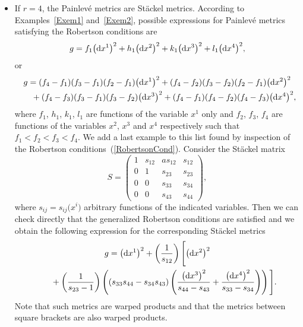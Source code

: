 \documentclass[pdftex]{sigma}
\numberwithin{equation}{section}
\begin{document}
\begin{itemize}
\item If $r=4$, the Painlev\'e metrics are St\"ackel metrics. According to Examples~\ref{Exem1} and~\ref{Exem2}, possible expressions for Painlev\'e metrics satisfying the Robertson conditions are
\begin{gather*} %
 g = f_1 \big({\rm d}x^1\big)^2 + h_1 \big({\rm d}x^2\big)^2 + k_1 \big({\rm d}x^3\big)^2 + l_1 \big({\rm d}x^4\big)^2,
\end{gather*}
or
\begin{gather*}
 g = (f_4 - f_1)(f_3-f_1)(f_2-f_1) \big({\rm d}x^1\big)^2 + (f_4-f_2)(f_3-f_2)(f_2-f_1) \big({\rm d}x^2\big)^2\nonumber \\
 \hphantom{g =}{} + (f_4-f_3)(f_3-f_1)(f_3-f_2) \big({\rm d}x^3\big)^2 + (f_4-f_1)(f_4-f_2)(f_4-f_3) \big({\rm d}x^4\big)^2, %
\end{gather*}
where $f_1$, $h_1$, $k_1$, $l_1$ are functions of the variable $x^1$ only and $f_2$, $f_3$, $f_4$ are functions of the variables $x^2$, $x^3$ and $x^4$ respectively such that $f_1 < f_2 < f_3 < f_4$. We add a last example to this list found by inspection of the Robertson conditions~(\ref{RobertsonCond}). Consider the St\"ackel matrix
\[
S=\left( \begin{matrix}
1&s_{12}&a s_{12}&s_{12}\\
0&1&s_{23}&s_{23} \\
0&0&s_{33}&s_{34} \\
0&0&s_{43}&s_{44}
\end{matrix} \right),
\]
where $s_{ij}=s_{ij}\big(x^i\big)$ arbitrary functions of the indicated variables. Then we can check directly that the generalized Robertson conditions are satisfied and we obtain the following expression for the corresponding St\"ackel metrics
\begin{gather*} %
 g = \big({\rm d}x^1\big)^2 + \left( \frac{1}{s_{12}} \right) \Bigg[ \big({\rm d}x^2\big)^2 \\
 \hphantom{g =}{} + \left( \frac{1}{s_{23}-1}\right) \left( (s_{33}s_{44} - s_{34}s_{43}) \left( \frac{\big({\rm d}x^3\big)^2}{s_{44}-s_{43}} + \frac{\big({\rm d}x^4\big)^2}{s_{33}-s_{34}} \right) \right) \Bigg].
\end{gather*}
Note that such metrics are warped products and that the metrics between square brackets are also warped products.
\end{itemize}
\end{document}
